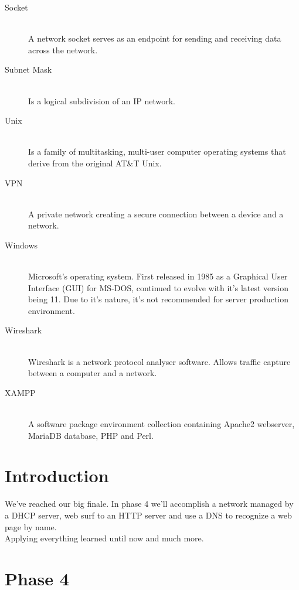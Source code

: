 \documentclass[11pt,a4paper]{report}
\begin{document}
\begin{description}
        \item[Socket] \hfill \\
            A network socket serves as an endpoint for sending and receiving data across the network.
        \item[Subnet Mask] \hfill \\
            Is a logical subdivision of an IP network.
        \item[Unix] \hfill \\
            Is a family of multitasking, multi-user computer operating systems that derive from the original AT\&T Unix.
        \item[VPN] \hfill \\
            A private network creating a secure connection between a device and a network.
        \item[Windows] \hfill \\
            Microsoft's operating system. First released in 1985 as a Graphical User Interface (GUI) for MS-DOS, continued to evolve with it's latest version being 11.
            Due to it's nature, it's not recommended for server production environment.
        \item[Wireshark] \hfill \\
            Wireshark is a network protocol analyser software. Allows traffic capture between a computer and a network.
        \item[XAMPP] \hfill \\
            A software package environment collection containing Apache2 webserver, MariaDB database, PHP and Perl.
    \end{description}

\chapter{Introduction}
    \pagestyle{fancy}
    We've reached our big finale. In phase 4 we'll accomplish a network managed by a DHCP server, web surf to an HTTP server and use a DNS to recognize a web page by name.\\
    Applying everything learned until now and much more.

    \setcounter{page}{1}

\chapter{Phase 4}
\end{document}
